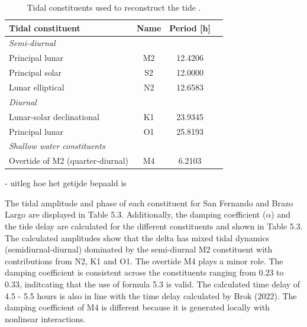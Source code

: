 \begin{table}[h!]
\centering
\caption{Tidal constituents used to reconstruct the tide
\autocite{BRON}.}
\label{tab:constituents}
\begin{tabular}{lccc}
\hline
\textbf{Tidal constituent} & \textbf{Name} & \textbf{Period [h]} \\
\hline
\multicolumn{3}{l}{\textit{Semi-diurnal}} \\
\hspace{1em}Principal lunar & M2 & 12.4206\\
\hspace{1em}Principal solar & S2 & 12.0000 \\
\hspace{1em}Lunar elliptical & N2 & 12.6583\\
\hline
\multicolumn{3}{l}{\textit{Diurnal}} \\
\hspace{1em}Lunar-solar declinational & K1 & 23.9345  \\
\hspace{1em}Principal lunar & O1 & 25.8193  \\
\hline
\multicolumn{3}{l}{\textit{Shallow water constituents}} \\
\hspace{1em}Overtide of M2 (quarter-diurnal) & M4 & 6.2103  \\
\hline
\end{tabular}
\end{table}

- uitleg hoe het getijde bepaald is

The tidal amplitude and phase of each constituent for San Fernando and Brazo Largo are displayed in Table 5.3. Additionally, the damping coefficient ($\alpha$) and the tide delay are calculated for the different constituents and shown in Table 5.3. The calculated amplitudes show that the delta has mixed tidal dynamics  (semidiurnal-diurnal)
dominated by the semi-diurnal M2 constituent with contributions from N2, K1 and O1. The overtide M4 plays a minor role. The damping coefficient is consistent across the constituents ranging from 0.23 to 0.33, inditcating that the use of formula 5.3 is valid. The calculated time delay of 4.5 - 5.5 hours is also in line with the time delay calculated by Brok (2022). The damping coefficient of M4 is different because it is generated locally with nonlinear interactions.

